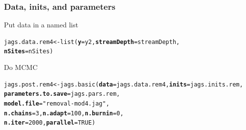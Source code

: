 \documentclass[color=usenames,dvipsnames]{beamer}\usepackage[]{graphicx}\usepackage[]{color}
\makeatletter
\newcommand{\hlnum}[1]{\textcolor[rgb]{0.69,0.494,0}{#1}}%
\newcommand{\hlstr}[1]{\textcolor[rgb]{0.749,0.012,0.012}{#1}}%
\newcommand{\hlstd}[1]{\textcolor[rgb]{0,0,0}{#1}}%
\newcommand{\hlkwb}[1]{\textcolor[rgb]{0,0.341,0.682}{#1}}%
\newcommand{\hlkwc}[1]{\textcolor[rgb]{0,0,0}{\textbf{#1}}}%
\newcommand{\hlkwd}[1]{\textcolor[rgb]{0.004,0.004,0.506}{#1}}%
\newenvironment{kframe}{%
 \def\at@end@of@kframe{}%
 \ifinner\ifhmode%
  \def\at@end@of@kframe{\end{minipage}}%
  \begin{minipage}{\columnwidth}%
 \fi\fi%
 \def\FrameCommand##1{\hskip\@totalleftmargin \hskip-\fboxsep
 \colorbox{shadecolor}{##1}\hskip-\fboxsep
     \hskip-\linewidth \hskip-\@totalleftmargin \hskip\columnwidth}%
 \MakeFramed {\advance\hsize-\width
   \@totalleftmargin\z@ \linewidth\hsize
   \@setminipage}}%
 {\par\unskip\endMakeFramed%
 \at@end@of@kframe}
\newenvironment{knitrout}{}{} %
\makeatother
\begin{document}
\begin{frame}[fragile]
  \frametitle{Data, inits, and parameters}
  Put data in a named list
  \vspace{-6pt}
\begin{knitrout}\small
{}\color{fgcolor}\begin{kframe}
\begin{alltt}
\hlstd{jags.data.rem4} \hlkwb{<-} \hlkwd{list}\hlstd{(}\hlkwc{y}\hlstd{=y2,} \hlkwc{streamDepth}\hlstd{=streamDepth,}
                       \hlkwc{nSites}\hlstd{=nSites)}
\end{alltt}
\end{kframe}
\end{knitrout}
\vfill
  Do MCMC
  \vspace{-6pt}
\begin{knitrout}\scriptsize
{}\color{fgcolor}\begin{kframe}
\begin{alltt}
\hlstd{jags.post.rem4} \hlkwb{<-} \hlkwd{jags.basic}\hlstd{(}\hlkwc{data}\hlstd{=jags.data.rem4,} \hlkwc{inits}\hlstd{=jags.inits.rem,}
                             \hlkwc{parameters.to.save}\hlstd{=jags.pars.rem,}
                             \hlkwc{model.file}\hlstd{=}\hlstr{"removal-mod4.jag"}\hlstd{,}
                             \hlkwc{n.chains}\hlstd{=}\hlnum{3}\hlstd{,} \hlkwc{n.adapt}\hlstd{=}\hlnum{100}\hlstd{,} \hlkwc{n.burnin}\hlstd{=}\hlnum{0}\hlstd{,}
                             \hlkwc{n.iter}\hlstd{=}\hlnum{2000}\hlstd{,} \hlkwc{parallel}\hlstd{=}\hlnum{TRUE}\hlstd{)}
\end{alltt}
\end{kframe}
\end{knitrout}
\end{frame}
\end{document}
